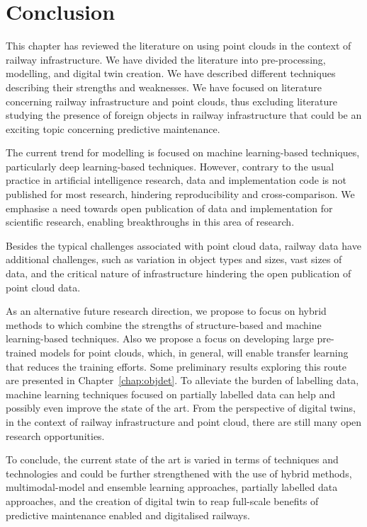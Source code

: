 \section{Conclusion}\label{sec:stoa:conclusion}
This chapter has reviewed the literature on using point clouds in the context of railway infrastructure. We have divided the literature into pre-processing, modelling, and digital twin creation. We have described different techniques describing their strengths and weaknesses.
We have focused on literature concerning railway infrastructure and point clouds, thus excluding literature studying the presence of foreign objects in railway infrastructure that could be an exciting topic concerning predictive maintenance.

The current trend for modelling is focused on machine learning-based techniques, particularly deep learning-based techniques. However, contrary to the usual practice in artificial intelligence research, data and implementation code is not published for most research, hindering reproducibility and cross-comparison. We emphasise a need towards open publication of data and implementation for scientific research, enabling breakthroughs in this area of research. 

Besides the typical challenges associated with point cloud data, railway data have additional challenges, such as variation in object types and sizes, vast sizes of data, and the critical nature of infrastructure hindering the open publication of point cloud data.

As an alternative future research direction, we propose to focus on hybrid methods to which combine the strengths of structure-based and machine learning-based techniques. Also we propose a focus on developing large pre-trained models for point clouds, which, in general, will enable transfer learning that reduces the training efforts. Some preliminary results exploring this route are presented in Chapter~\ref{chap:objdet}. To alleviate the burden of labelling data, machine learning techniques focused on partially labelled data can help and possibly even improve the state of the art. From the perspective of digital twins, in the context of railway infrastructure and point cloud, there are still many open research opportunities.

To conclude, the current state of the art is varied in terms of techniques and technologies and could be further strengthened with the use of hybrid methods, multimodal-model and ensemble learning approaches, partially labelled data approaches, and the creation of digital twin to reap full-scale benefits of predictive maintenance enabled and digitalised railways.